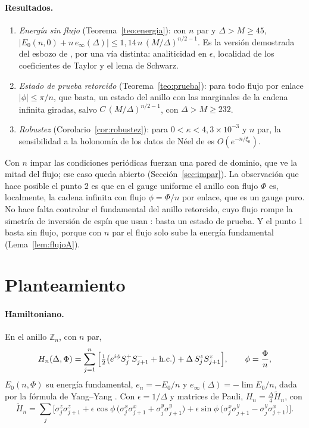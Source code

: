 \documentclass[11pt,a4paper]{article}
\theoremstyle{remark}
\begin{document}
\paragraph{Resultados.}
\begin{enumerate}
\item \emph{Energía sin flujo} (Teorema~\ref{teo:energia}): con $n$ par y $\Delta>M\ge45$,
  $|E_0(n,0)+n\,e_\infty(\Delta)|\le1{,}14\,n\,(M/\Delta)^{n/2-1}$. Es la versión demostrada del esbozo
  de \cite{dk-quasi}, por una vía distinta: analiticidad en $\epsilon$, localidad de los coeficientes
  de Taylor y el lema de Schwarz.
\item \emph{Estado de prueba retorcido} (Teorema~\ref{teo:prueba}): para todo flujo por enlace
  $|\phi|\le\pi/n$, que basta, un estado del anillo con las marginales de la cadena infinita giradas,
  salvo $C\,(M/\Delta)^{n/2-1}$, con $\Delta>M\ge232$.
\item \emph{Robustez} (Corolario~\ref{cor:robustez}): para $0<\kappa<4{,}3\times10^{-3}$ y $n$ par, la sensibilidad a la holonomía de los datos de Néel de
  \cite{robustez} es $O(e^{-n/\xi_0})$.
\end{enumerate}
Con $n$ impar las condiciones periódicas fuerzan una pared de dominio, que ve la mitad del flujo; ese
caso queda abierto (Sección~\ref{sec:impar}).
La observación que hace posible el punto 2 es que en el gauge uniforme el anillo con flujo $\Phi$
es, localmente, la cadena infinita con flujo $\phi=\Phi/n$ por enlace, que es un gauge puro. No hace
falta controlar el fundamental del anillo retorcido, cuyo flujo rompe la simetría de inversión de
espín que usan \cite{dk-quasi,dk-kink}: basta un estado de prueba. Y el punto 1 basta sin flujo,
porque con $n$ par el flujo solo sube la energía fundamental (Lema~\ref{lem:flujoA}).

\section{Planteamiento}\label{sec:planteamiento}

\paragraph{Hamiltoniano.} En el anillo $\mathbb Z_n$, con $n$ par,
\[
  H_n(\Delta,\Phi)=\sum_{j=1}^n\Big[\tfrac12\big(e^{i\phi}S^+_jS^-_{j+1}+{\rm h.c.}\big)+\Delta\,S^z_jS^z_{j+1}\Big],
  \qquad\phi=\frac\Phi n,
\]
$E_0(n,\Phi)$ su energía fundamental, $e_n=-E_0/n$ y $e_\infty(\Delta)=-\lim E_0/n$, dada por la
fórmula de Yang--Yang \cite{yang-yang}. Con $\epsilon=1/\Delta$ y matrices de Pauli,
$H_n=\tfrac\Delta4\widetilde H_n$, con
\[
  \widetilde H_n=\sum_j\Big[\sigma^z_j\sigma^z_{j+1}+\epsilon\cos\phi\,\big(\sigma^x_j\sigma^x_{j+1}+\sigma^y_j\sigma^y_{j+1}\big)
  +\epsilon\sin\phi\,\big(\sigma^x_j\sigma^y_{j+1}-\sigma^y_j\sigma^x_{j+1}\big)\Big].
\]
\end{document}
